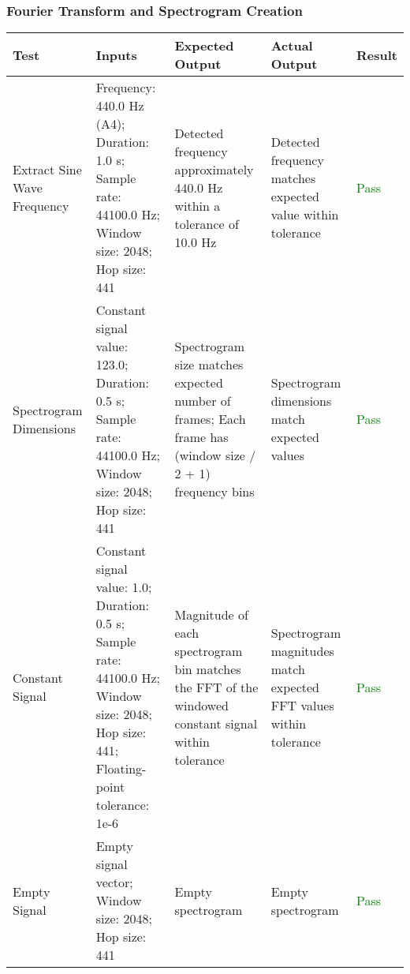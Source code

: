 \documentclass[12pt, titlepage]{article}
\begin{document}
\subsubsection{Fourier Transform and Spectrogram Creation}
\begin{longtable}{|L{3cm}|L{3cm}|L{2.5cm}|L{2.5cm}|l|}
  \hline
  \textbf{Test} & \textbf{Inputs} & \textbf{Expected Output} & \textbf{Actual Output} & \textbf{Result} \\
  \hline
  Extract Sine Wave Frequency &
    Frequency: 440.0 Hz (A4); \newline
    Duration: 1.0 s; \newline
    Sample rate: 44100.0 Hz; \newline
    Window size: 2048; \newline
    Hop size: 441 &
    Detected frequency approximately 440.0 Hz within a tolerance of 10.0 Hz &
    Detected frequency matches expected value within tolerance &
    \textcolor{green}{Pass} \\
  \hline

  Spectrogram Dimensions &
    Constant signal value: 123.0; \newline
    Duration: 0.5 s; \newline
    Sample rate: 44100.0 Hz; \newline
    Window size: 2048; \newline
    Hop size: 441 &
    Spectrogram size matches expected number of frames; \newline
    Each frame has (window size / 2 + 1) frequency bins &
    Spectrogram dimensions match expected values &
    \textcolor{green}{Pass} \\
  \hline

  Constant Signal &
    Constant signal value: 1.0; \newline
    Duration: 0.5 s; \newline
    Sample rate: 44100.0 Hz; \newline
    Window size: 2048; \newline
    Hop size: 441; \newline
    Floating-point tolerance: 1e-6 &
    Magnitude of each spectrogram bin matches the FFT of the windowed constant signal within tolerance &
    Spectrogram magnitudes match expected FFT values within tolerance &
    \textcolor{green}{Pass} \\
  \hline

  Empty Signal &
    Empty signal vector; \newline
    Window size: 2048; \newline
    Hop size: 441 &
    Empty spectrogram &
    Empty spectrogram &
    \textcolor{green}{Pass} \\
  \hline
\end{longtable}
\end{document}

